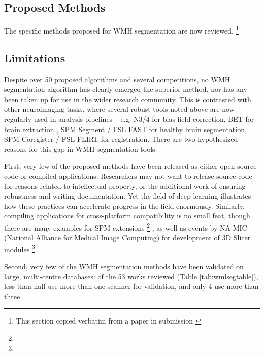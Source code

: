 \subsection{Proposed Methods}\label{ss:priorproposed}
The specific methods proposed for WMH segmentation are now reviewed.%
\footnote{This section copied verbatim from a paper in submission \cite{Knight2017a}}
\newcommand{\priorworksub}[1]{\subsubsection{#1}}

\subsection{Limitations}\label{ss:priorlimits}
Despite over 50 proposed algorithms and several competitions, no WMH segmentation algorithm has clearly emerged the superior method, nor has any been taken up for use in the wider research community.
This is contrasted with other neuroimaging tasks, where several robust tools noted above are now regularly used in analysis pipelines -- e.g.
N3/4 \cite{Tustison2010} for bias field correction,
BET for brain extraction \cite{Smith2002a},
SPM Segment \cite{Ashburner2005} / FSL FAST \cite{Zhang2001} for healthy brain segmentation,
SPM Coregister \cite{Ashburner2005} / FSL FLIRT \cite{Jenkinson2001} for registration.
There are two hypothesized reasons for this gap in WMH segmentation tools.
\par
First, very few of the proposed methods have been released as either open-source code or compiled applications.
Researchers may not want to release source code for reasons related to intellectual property, or the additional work of ensuring robustness and writing documentation.
Yet the field of deep learning illustrates how these practices can accelerate progress in the field enormously.
Similarly, compiling applications for cross-platform compatibility is no small feat, though there are many examples for SPM extensions%
\footnote{}%
, as well as events by NA-MIC (National Alliance for Medical Image Computing) for development of 3D Slicer modules%
\footnote{}.
\par
Second, very few of the WMH segmentation methods have been validated on large, multi-centre databases: of the 53 works reviewed (Table \ref{tab:wmlsegtable}), less than half use more than one scanner for validation, and only 4 use more than three.
